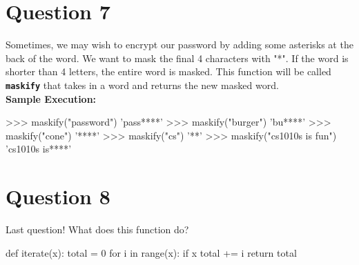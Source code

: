 \section{Question 7}
Sometimes, we may wish to encrypt our password by adding some asterisks at the back of the word. We want to mask the final 4 characters
with "*". If the word is shorter than 4 letters, the entire word is masked. This function will be called \texttt{\bfseries maskify} that takes in a word and
returns the new masked word. \\
\textbf{Sample Execution:}
\begin{python}
  >>> maskify("password")
  'pass****'
  >>> maskify("burger")
  'bu****'
  >>> maskify("cone")
  '****'
  >>> maskify("cs")
  '**'
  >>> maskify("cs1010s is fun")
  'cs1010s is****'
\end{python}

\section{Question 8}
Last question! What does this function do?
\begin{python}
  def iterate(x):
    total = 0
    for i in range(x):
      if x %
        total += i
  return total
\end{python}

